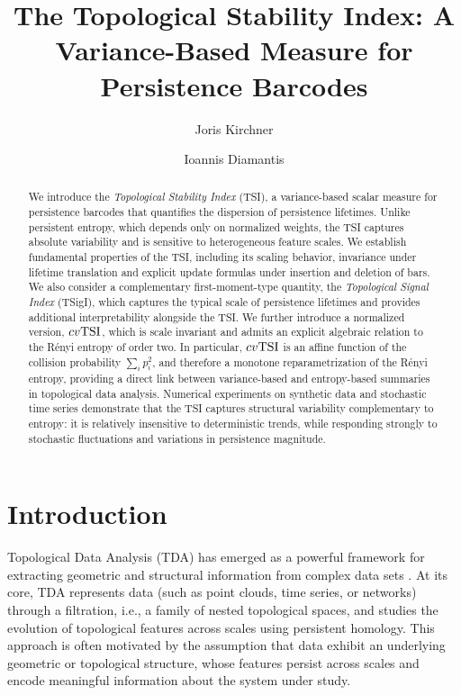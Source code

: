 \documentclass[11pt]{amsart}
\title{The Topological Stability Index: A Variance-Based Measure for Persistence Barcodes}
\author{Joris Kirchner}
\author{Ioannis Diamantis}
\theoremstyle{definition}
\newcommand{\tsi}[0]{\textup{TSI}}
\begin{document}
\begin{abstract}
We introduce the \emph{Topological Stability Index} (TSI), a variance-based scalar measure for persistence barcodes that quantifies the dispersion of persistence lifetimes. Unlike persistent entropy, which depends only on normalized weights, the TSI captures absolute variability and is sensitive to heterogeneous feature scales. We establish fundamental properties of the TSI, including its scaling behavior, invariance under lifetime translation and explicit update formulas under insertion and deletion of bars. We also consider a complementary first-moment-type quantity, the \emph{Topological Signal Index} (TSigI), which captures the typical scale of persistence lifetimes and provides additional interpretability alongside the TSI. We further introduce a normalized version, $cv\tsi$, which is scale invariant and admits an explicit algebraic relation to the Rényi entropy of order two. In particular, $cv\tsi$ is an affine function of the collision probability $\sum_i p_i^2$, and therefore a monotone reparametrization of the Rényi entropy, providing a direct link between variance-based and entropy-based summaries in topological data analysis. Numerical experiments on synthetic data and stochastic time series demonstrate that the TSI captures structural variability complementary to entropy: it is relatively insensitive to deterministic trends, while responding strongly to stochastic fluctuations and variations in persistence magnitude.
\end{abstract}

\begingroup
\renewcommand\thefootnote{}
\renewcommand\footnoterule{}
\endgroup

\maketitle

\section{Introduction}


Topological Data Analysis (TDA) has emerged as a powerful framework for extracting geometric and structural information from complex data sets \cite{zomorodian_computing_2005}. At its core, TDA represents data (such as point clouds, time series, or networks) through a filtration, i.e., a family of nested topological spaces, and studies the evolution of topological features across scales using persistent homology. This approach is often motivated by the assumption that data exhibit an underlying geometric or topological structure, whose features persist across scales and encode meaningful information about the system under study.
\end{document}
